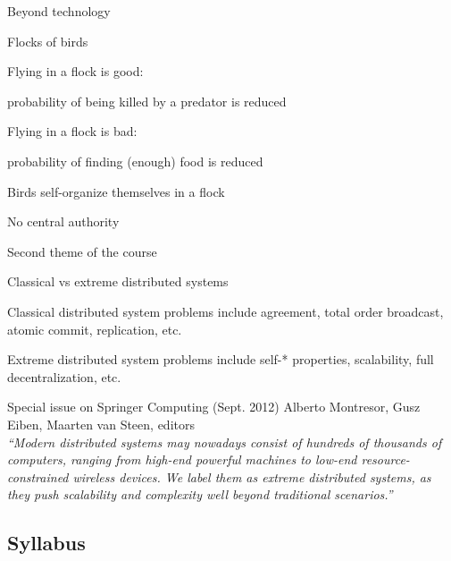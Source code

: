 \begin{frame}{Beyond technology}

\begin{block}{Flocks of birds}
\BI
\item Flying in a flock is good: 
	\BI
	\item probability of being killed by a predator is reduced
	\EI
\item Flying in a flock is bad: 
	\BI
	\item probability of finding (enough) food is reduced
	\EI
\item Birds self-organize themselves in a flock
\item No central authority
\EI
\end{block}

\end{frame}



\begin{frame}{Second theme of the course}

\begin{block}{Classical vs extreme distributed systems}
\BI
\item Classical distributed system problems include agreement, total order
  broadcast, atomic commit, replication, etc.
\item Extreme distributed system problems include self-* properties, 
  scalability, full decentralization, etc.
\EI
\end{block}

\begin{block}{Special issue on Springer Computing (Sept. 2012)}
Alberto Montresor, Gusz Eiben, Maarten van Steen, editors\\

\textit{“Modern distributed systems may nowadays consist of hundreds of
thousands of computers, ranging from high-end powerful machines to low-end
resource-constrained wireless devices. We label them as extreme distributed
systems, as they push scalability and complexity well beyond traditional
scenarios.”}

\end{block}

\end{frame}

\subsection{Syllabus}

